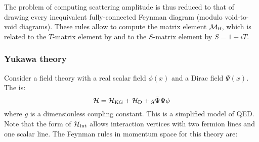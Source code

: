 The problem of computing scattering amplitude is thus reduced to that of drawing every inequivalent fully-connected Feynman diagram (modulo void-to-void diagrams). These rules allow to compute the matrix element $ \mathcal{M}_\text{if} $, which is related to the $ T $-matrix element by  and to the $ S $-matrix element by $ S = 1 + i T $.

\subsubsection{Yukawa theory}

Consider a field theory with a real scalar field $ \phi(x) $ and a Dirac field $ \Psi(x) $. The  is:
\begin{equation}
  \mathcal{H} = \mathcal{H}_\text{KG} + \mathcal{H}_\text{D} + g \bar{\Psi} \Psi \phi
\end{equation}
where $ g $ is a dimensionless coupling constant. This is a simplified model of QED. Note that the form of $ \mathcal{H}_\text{int} $ allows interaction vertices with two fermion lines and one scalar line. The Feynman rules in momentum space for this theory are:
